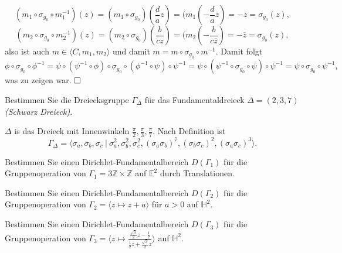 \documentclass[11pt]{book}
\numberwithin{dummy}{section}
\theoremstyle{nonumberbreak}
\newenvironment{prob}[1][]{\ifthenelse{\equal{#1}{}}{\problem}{\problem[#1]}\rm}{\endproblem}
\newenvironment{sol}[1][]{\ifthenelse{\equal{#1}{}}{\solution}{\solution[#1]}\rm}{\endsolution}
\newcommand{\Z}{\mathbb{Z}}
\newcommand{\E}{\mathbb{E}}
\newcommand{\He}{\mathbb{H}}
\begin{document}
\begin{spacing}{1.4}
\begin{prob}
\begin{sol}
\begin{compactenum}
$$(m_1 \circ \sigma_{g_0} \circ m_1^{-1})(z) = (m_1 \circ \sigma_{g_0})\left( \frac{d}{a}z\right) = (m_1\left( - \frac{d}{a} \overline{z}\right) = - \overline{z} = \sigma_{g_0}(z),$$
$$(m_2 \circ \sigma_{g_0} \circ m_2^{-1})(z) = (m_2 \circ \sigma_{g_0})\left( \frac{b}{cz}\right) = (m_2\left( - \frac{b}{c \overline{z}}\right) = - \overline{z} = \sigma_{g_0}(z),$$
also ist auch $m\in \langle C,m_1,m_2\rangle$ und damit $m= m \circ \sigma_{g_0} \circ m^{-1}$. Damit folgt 
$$\phi \circ \sigma_{g_0} \circ \phi^{-1} = \psi \circ (\psi^{-1} \circ \phi) \circ \sigma_{g_0} \circ ( \phi^{-1} \circ \psi) \circ \psi^{-1} = \psi \circ (\psi^{-1} \circ \sigma_{g_0} \circ \psi ) \circ \psi^{-1} = \psi \circ \sigma_{g_0} \circ \psi^{-1}, $$
was zu zeigen war. $\hfill \Box$

\end{compactenum}

\end{sol}

\end{prob}




\begin{prob}   %
Bestimmen Sie die Dreiecksgruppe $\Gamma_{\Delta}$ für das Fundamentaldreieck $\Delta=(2,3,7)$ \textit{(Schwarz Dreieck)}.


\begin{sol}
$\Delta$ is das Dreieck mit Innenwinkeln $\frac{\pi}{2}, \frac{\pi}{3}, \frac{\pi}{7}$. Nach Definition ist 
$$\Gamma_{\Delta} = \langle \sigma_a, \sigma_b, \sigma_c \ \vert \ \sigma_a^2, \sigma_b^2, \sigma_c^2, (\sigma_a\sigma_b)^7, (\sigma_b\sigma_c)^2, (\sigma_a \sigma_c)^3 \rangle.$$

\end{sol}

\end{prob}




\begin{prob} %
\begin{compactenum}
\item Bestimmen Sie einen Dirichlet-Fundamentalbereich $D(\Gamma_1)$ für die Gruppenoperation von $\Gamma_1= 3 \Z \times \Z$ auf $\E^2$ durch Translationen.
\item Bestimmen Sie einen Dirichlet-Fundamentalbereich $D(\Gamma_2)$ für die Gruppenoperation von $\Gamma_2=\langle z \mapsto z+a \rangle$ für $a >0$ auf $\He^2$.
\item Bestimmen Sie einen Dirichlet-Fundamentalbereich $D(\Gamma_3)$ für die Gruppenoperation von $\Gamma_3=\Big\langle z \mapsto \frac{\frac{\sqrt{3}}{2}z - \frac{1}{2}}{\frac{1}{2}z + \frac{\sqrt{3}}{2}z} \Big\rangle$ auf $\He^2$.



\end{compactenum}
\end{prob}
\end{spacing}
\end{document}
